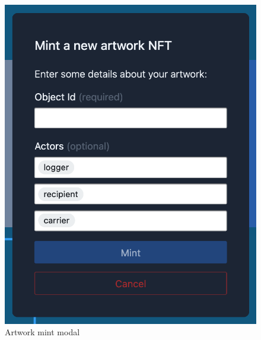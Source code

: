 \begin{figure}
    \centering
    \begin{minipage}{0.45\textwidth}
        \centering
        \includegraphics[height=0.4\textheight]{resources/frontend_screenshots/mint_modal.png}
        \caption{Artwork mint modal}
        \label{fig:mint_modal}
    \end{minipage}\hfill
    \begin{minipage}{0.45\textwidth}
        \centering

\end{minipage}
\end{figure}
